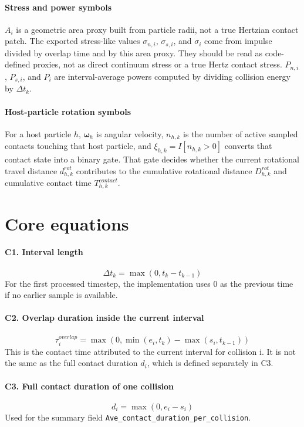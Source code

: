 \documentclass[11pt,a4paper]{article}
\newcommand{\code}[1]{\begingroup\urlstyle{tt}\footnotesize\nolinkurl{#1}\endgroup}
\begin{document}
\paragraph{Stress and power symbols}
$A_i$ is a geometric area proxy built from particle radii, not a true Hertzian contact patch.
The exported stress-like values $\sigma_{n,i}$, $\sigma_{s,i}$, and $\sigma_i$ come from impulse divided by overlap time and by this area proxy.
They should be read as code-defined proxies, not as direct continuum stress or a true Hertz contact stress.
$P_{n,i}$, $P_{s,i}$, and $P_i$ are interval-average powers computed by dividing collision energy by $\Delta t_k$.

\paragraph{Host-particle rotation symbols}
For a host particle $h$, $\boldsymbol{\omega}_h$ is angular velocity, $n_{h,k}$ is the number of active sampled contacts touching that host particle, and $\xi_{h,k} = I[n_{h,k} > 0]$ converts that contact state into a binary gate.
That gate decides whether the current rotational travel distance $d_{h,k}^{rot}$ contributes to the cumulative rotational distance $D_{h,k}^{rot}$ and cumulative contact time $T_{h,k}^{contact}$.

\section*{Core equations}
\paragraph{C1. Interval length}
\[
\Delta t_k = \max(0, t_k - t_{k-1})
\]
For the first processed timestep, the implementation uses 0 as the previous time if no earlier sample is available.

\paragraph{C2. Overlap duration inside the current interval}
\[
\tau_i^{overlap} = \max\!\left(0, \min(e_i, t_k) - \max(s_i, t_{k-1})\right)
\]
This is the contact time attributed to the current interval for collision i.
It is not the same as the full contact duration $d_i$, which is defined separately in C3.

\paragraph{C3. Full contact duration of one collision}
\[
d_i = \max(0, e_i - s_i)
\]
Used for the summary field \code{Ave_contact_duration_per_collision}.
\end{document}
